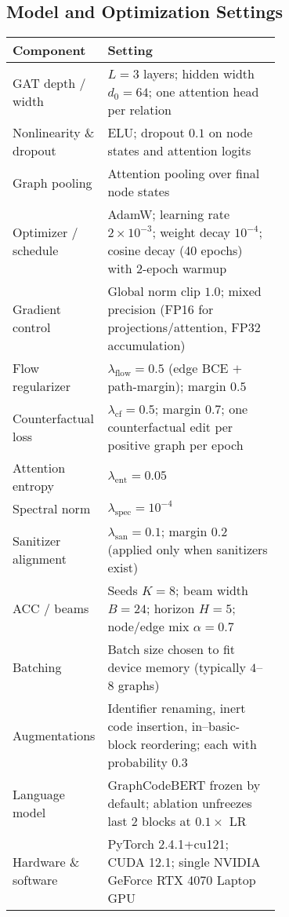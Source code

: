 \documentclass{buthesis}
\begin{document}
\begin{appendices}
\section{Model and Optimization Settings}
\begin{table}[H]
\small
\setlength{\tabcolsep}{6pt}
\renewcommand{\arraystretch}{1.12}
\begin{tabular}{lp{0.68\linewidth}}
\toprule
\textbf{Component} & \textbf{Setting} \\
\midrule
GAT depth / width & $L{=}3$ layers; hidden width $d_0{=}64$; one attention head per relation \\
Nonlinearity \& dropout & ELU; dropout $0.1$ on node states and attention logits \\
Graph pooling & Attention pooling over final node states \\
Optimizer / schedule & AdamW; learning rate $2\times10^{-3}$; weight decay $10^{-4}$; cosine decay (40 epochs) with 2-epoch warmup \\
Gradient control & Global norm clip $1.0$; mixed precision (FP16 for projections/attention, FP32 accumulation) \\
Flow regularizer & $\lambda_{\text{flow}}{=}0.5$ (edge BCE $+$ path-margin); margin $0.5$ \\
Counterfactual loss & $\lambda_{\text{cf}}{=}0.5$; margin $0.7$; one counterfactual edit per positive graph per epoch \\
Attention entropy & $\lambda_{\text{ent}}{=}0.05$ \\
Spectral norm & $\lambda_{\text{spec}}{=}10^{-4}$ \\
Sanitizer alignment & $\lambda_{\text{san}}{=}0.1$; margin $0.2$ (applied only when sanitizers exist) \\
ACC / beams & Seeds $K{=}8$; beam width $B{=}24$; horizon $H{=}5$; node/edge mix $\alpha{=}0.7$ \\
Batching & Batch size chosen to fit device memory (typically $4$–$8$ graphs) \\
Augmentations & Identifier renaming, inert code insertion, in–basic-block reordering; each with probability $0.3$ \\
Language model & GraphCodeBERT frozen by default; ablation unfreezes last 2 blocks at $0.1\times$ LR \\
Hardware \& software & PyTorch 2.4.1+cu121; CUDA 12.1; single NVIDIA GeForce RTX 4070 Laptop GPU \\
\bottomrule
\end{tabular}
\end{table}


\end{appendices}
\end{document}
